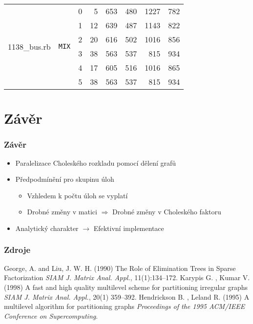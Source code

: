 \documentclass{beamer}
\begin{document}
\begin{frame}
\begin{itemize}
\begin{table}[ht]
\begin{tabular}{|l|c|c|r|r|r|r|r|}
        \hline
        \multirow{6}{*}{1138\_bus.rb}
        & \multirow{6}{*}{\texttt{MIX}} & 0 
        &	5	&	653	&	480	& 1227	&	782 \\
        & & 1 
        &	12	&	639	&	487	&	1143	&	822	\\
        & & 2
        &	20	&	616	&	502	&	1016	&	856	\\
        & & 3
        &	38	&	563	&	537	&	815	&	934	\\
        & & 4
        &	17	&	605	&	516	&	1016	&	865	\\
        & & 5
      	&	38	&	563	&	537	&	815	&	934	\\
      \hline
      \end{tabular}
    \end{table}
  \end{itemize}
\end{frame}

	\section*{Závěr}
\begin{frame}
    \frametitle{Závěr}
    \begin{itemize}
      \item Paralelizace Choleského rozkladu pomocí dělení grafů
      \medskip
      \item Předpodmínění pro skupinu úloh
      \medskip
      \begin{itemize}
        \item Vzhledem k počtu úloh se vyplatí
        \medskip
        \item Drobné změny v matici $\Rightarrow$ Drobné změny v Choleského faktoru
      \end{itemize}
      \medskip
      \item Analytický charakter $\rightarrow$ Efektivní implementace
    \end{itemize}
\end{frame}

\begin{frame}
	\frametitle{Zdroje}
	\footnotesize{
	\begin{thebibliography}{99}
		\bibitem{} George, A. and Liu, J. W. H. (1990)
			\newblock The Role of Elimination Trees in Sparse Factorization
			\newblock \emph{SIAM J. Matrix Anal. Appl.}, 11(1):134--172.
    \bibitem{} Karypis G. , Kumar V. (1998)
			\newblock A fast and high quality multilevel scheme for partitioning irregular graphs
			\newblock \emph{SIAM J. Matrix Anal. Appl.}, 20(1) 359--392.
    \bibitem{} Hendrickson B. , Leland R. (1995)
			\newblock  A multilevel algorithm for partitioning graphs
			\newblock \emph{Proceedings of the 1995 ACM/IEEE Conference on Supercomputing}.
	\end{thebibliography}
	}
\end{frame}
\end{document}
